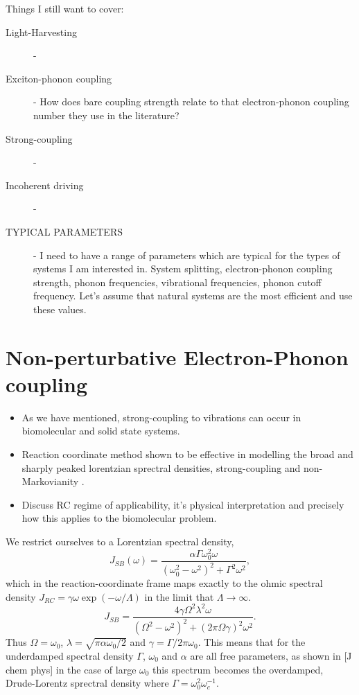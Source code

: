 \documentclass[]{article}
\begin{document}
Things I still want to cover:
\begin{description}
	\item[Light-Harvesting] - 
	\item[Exciton-phonon coupling] - How does bare coupling strength relate to that electron-phonon coupling number they use in the literature?
	\item[Strong-coupling] - 
	\item[Incoherent driving] - 
	\item[TYPICAL PARAMETERS] - I need to have a range of parameters which are typical for the types of systems I am interested in. System splitting, electron-phonon coupling strength, phonon frequencies, vibrational frequencies, phonon cutoff frequency. Let's assume that natural systems are the most efficient and use these values.
\end{description}
\section{Non-perturbative Electron-Phonon coupling}
\begin{itemize}
	\item As we have mentioned, strong-coupling to vibrations can occur in biomolecular and solid state systems.
	\item Reaction coordinate method shown to be effective in modelling the broad and sharply peaked lorentzian sprectral densities, strong-coupling and non-Markovianity \cite{keylist}.
	\item Discuss RC regime of applicability, it's physical interpretation and precisely how this applies to the biomolecular problem.
\end{itemize}

We restrict ourselves to a Lorentzian spectral density, 
\begin{equation}
\label{eq:DrudeLorentzUnderdamped}
J_{SB}(\omega) = \frac{\alpha \Gamma \omega_0^2\omega}{(\omega_0^2-\omega^2)^2 + \Gamma^2\omega^2},
\end{equation}
which in the reaction-coordinate frame maps exactly to the ohmic spectral density $J_{RC} = \gamma \omega \exp(-\omega/\Lambda)$ in the limit that $\Lambda\to\infty$.
\begin{equation}
\label{eq:DrudeLorentzUnderdamped1}
J_{SB}  = \frac{4\gamma\Omega^2\lambda^2\omega}{(\Omega^2-\omega^2)^2 + (2\pi\Omega\gamma)^2\omega^2}.
\end{equation}
Thus $\Omega = \omega_0$, $\lambda=\sqrt{\pi \alpha \omega_0/2}$ and $\gamma=\Gamma/2\pi\omega_0$. This means that for the underdamped spectral density $\Gamma$, $\omega_0$ and $\alpha$ are all free parameters, as shown in [J chem phys] in the case of large $\omega_0$ this spectrum becomes the overdamped, Drude-Lorentz sprectral density where $\Gamma=\omega_0^2\omega_c^{-1}$.
\end{document}
